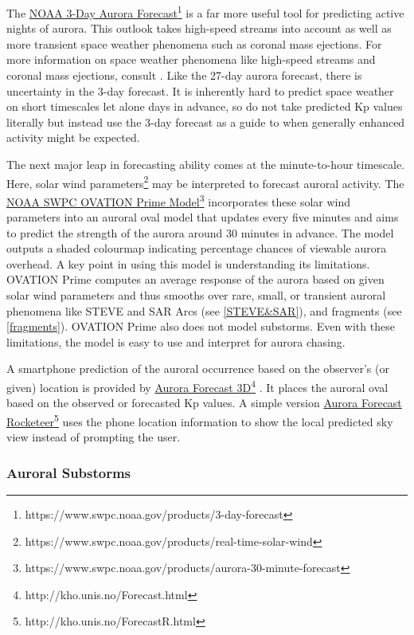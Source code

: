 \documentclass{article}
\renewcommand{\cite}[1]{\parencite{#1}}
\begin{document}
The \href{https://www.swpc.noaa.gov/products/3-day-forecast}{NOAA 3-Day Aurora Forecast}\footnote{https://www.swpc.noaa.gov/products/3-day-forecast} is a far more useful tool for predicting active nights of aurora. This outlook takes high-speed streams into account as well as more transient space weather phenomena such as coronal mass ejections. For more information on space weather phenomena like high-speed streams and coronal mass ejections, consult \cite{Ledvina2022}. Like the 27-day aurora forecast, there is uncertainty in the 3-day forecast. It is inherently hard to predict space weather on short timescales let alone days in advance, so do not take predicted Kp values literally but instead use the 3-day forecast as a guide to when generally enhanced activity might be expected.

The next major leap in forecasting ability comes at the minute-to-hour timescale. Here, solar wind parameters\footnote{https://www.swpc.noaa.gov/products/real-time-solar-wind} may be interpreted to forecast auroral activity. The \href{https://www.swpc.noaa.gov/products/aurora-30-minute-forecast}{NOAA SWPC OVATION Prime Model}\footnote{https://www.swpc.noaa.gov/products/aurora-30-minute-forecast} \cite{Newell2014} incorporates these solar wind parameters into an auroral oval model that updates every five minutes and aims to predict the strength of the aurora around 30 minutes in advance. The model outputs a shaded colourmap indicating percentage chances of viewable aurora overhead. A key point in using this model is understanding its limitations. OVATION Prime computes an average response of the aurora based on given solar wind parameters and thus smooths over rare, small, or transient auroral phenomena like STEVE and SAR Arcs (see \ref{STEVE&SAR}), and fragments (see \ref{fragments}). OVATION Prime also does not model substorms. Even with these limitations, the model is easy to use and interpret for aurora chasing.

A smartphone prediction of the auroral occurrence based on the observer's (or given) location is provided by \href{http://kho.unis.no/Forecast.html}{Aurora Forecast 3D}\footnote{http://kho.unis.no/Forecast.html} \cite{Sigernes2011}. It places the auroral oval based on the observed or forecasted Kp values. A simple version \href{http://kho.unis.no/ForecastR.html}{Aurora Forecast Rocketeer}\footnote{http://kho.unis.no/ForecastR.html} uses the phone location information to show the local predicted sky view instead of prompting the user.

\subsubsection{Auroral Substorms}
\label{sec: substorm}
\end{document}
